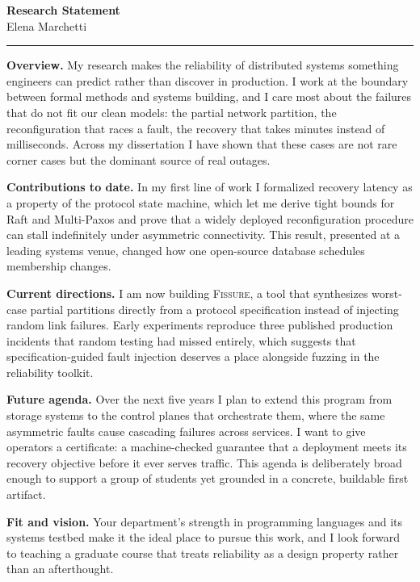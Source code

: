 \documentclass[11pt]{article}
\newcommand{\lead}[1]{{\color{accent}\bfseries #1.}\hspace{0.4em}}
\begin{document}
\begin{center}
  {\LARGE\bfseries Research Statement}\\[0.3em]
  {\large Elena Marchetti}\\[0.2em]
  {\small\color{accent}\rule{0.3\textwidth}{0.8pt}}
\end{center}

\vspace{0.4em}

\lead{Overview}
My research makes the reliability of distributed systems something engineers can
predict rather than discover in production. I work at the boundary between formal
methods and systems building, and I care most about the failures that do not fit
our clean models: the partial network partition, the reconfiguration that races a
fault, the recovery that takes minutes instead of milliseconds. Across my
dissertation I have shown that these cases are not rare corner cases but the
dominant source of real outages.

\lead{Contributions to date}
In my first line of work I formalized recovery latency as a property of the
protocol state machine, which let me derive tight bounds for Raft and
Multi-Paxos and prove that a widely deployed reconfiguration procedure can stall
indefinitely under asymmetric connectivity. This result, presented at a leading
systems venue, changed how one open-source database schedules membership
changes.

\lead{Current directions}
I am now building \textsc{Fissure}, a tool that synthesizes worst-case partial
partitions directly from a protocol specification instead of injecting random
link failures. Early experiments reproduce three published production incidents
that random testing had missed entirely, which suggests that specification-guided
fault injection deserves a place alongside fuzzing in the reliability toolkit.

\lead{Future agenda}
Over the next five years I plan to extend this program from storage systems to
the control planes that orchestrate them, where the same asymmetric faults cause
cascading failures across services. I want to give operators a certificate: a
machine-checked guarantee that a deployment meets its recovery objective before
it ever serves traffic. This agenda is deliberately broad enough to support a
group of students yet grounded in a concrete, buildable first artifact.

\lead{Fit and vision}
Your department's strength in programming languages and its systems testbed make
it the ideal place to pursue this work, and I look forward to teaching a graduate
course that treats reliability as a design property rather than an afterthought.
\end{document}

